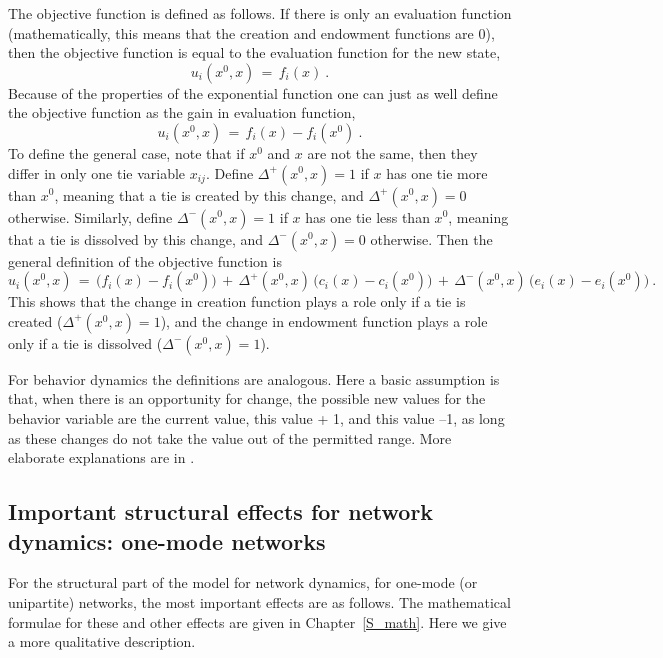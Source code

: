 \documentclass[a4paper,fleqn,11pt]{article}
\newcommand{\+}{\, + \,}
\begin{document}
The objective function is defined as follows.
If there is only an evaluation function (mathematically, this means that
the creation and endowment functions are 0), then
the objective function is equal to the evaluation function for the new state,
\[
   u_i(x^0, x) \,=\, f_i(x) \ .
\]
Because of the properties of the exponential function one can just as
well define the objective function as the gain in evaluation function,
\[
   u_i(x^0, x) \,=\, f_i(x) - f_i(x^0) \ .
\]
To define the general case, note that if $x^0$ and $x$ are not the same,
then they differ in only one tie variable $x_{ij}$.
Define  $\Delta^+(x^0, x) = 1$ if $x$ has one tie more than $x^0$,
meaning that a tie is created by this change, and $\Delta^+(x^0, x) = 0$
otherwise.
Similarly, define  $\Delta^-(x^0, x) = 1$ if $x$ has one tie less than $x^0$,
meaning that a tie is dissolved by this change, and $\Delta^-(x^0, x) = 0$
otherwise.
Then the general definition of the objective function is
\[
   u_i(x^0, x) \,=\, \big(f_i(x) - f_i(x^0)\big)
                   \,+\,  \Delta^+(x^0, x)\,\big(c_i(x) - c_i(x^0)\big)
                   \,+\,  \Delta^-(x^0, x)\,\big(e_i(x) - e_i(x^0)\big)    \ .
\]
This shows that the change in creation function plays a role
only if a tie is created ($\Delta^+(x^0,x) = 1$), and the change in
endowment function plays a role
only if a tie is dissolved ($\Delta^-(x^0,x) = 1$).
\medskip

For behavior dynamics the definitions are analogous.
Here a basic assumption is that, when there is an opportunity for change,
the possible new values for the behavior variable are the current
value, this value + 1, and this value --1, as long as these changes
do not take the value out of the permitted range.
More elaborate explanations are in
\citep*{SnijdersEA07, SnijdersEA10b, SteglichEA10, VeenstraEtAl2013}.

\subsection{Important structural effects for network dynamics:
           \protect\newline one-mode networks}
\label{S_imp_str1}

For the structural part of the model for network dynamics,
for one-mode (or unipartite) networks,
the most important effects are as follows.
The mathematical formulae for these and other effects are given
in Chapter~\ref{S_math}. Here we give a more qualitative description.
\end{document}
